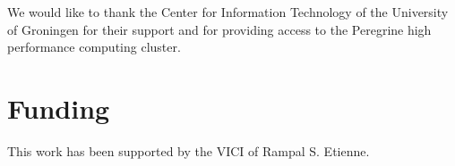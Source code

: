 \documentclass{bioinfo}
\begin{document}
We would like to thank the Center for Information Technology of the University of Groningen for their support
and for providing access to the Peregrine high performance computing cluster.

\section*{Funding}

This work has been supported by the VICI of Rampal S. Etienne.


%
%
%
%
%

%



\begin{thebibliography}{}

\end{thebibliography}
\end{document}
